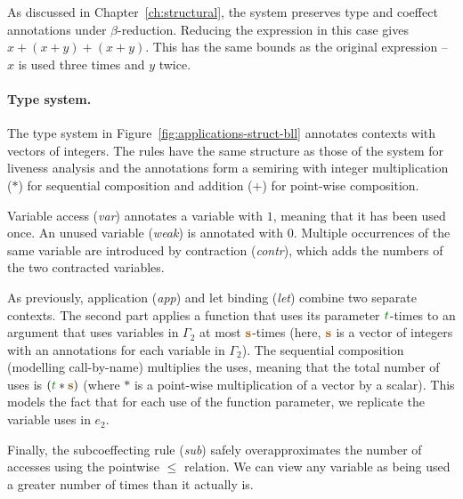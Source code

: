 As discussed in Chapter~\ref{ch:structural}, the system preserves type and coeffect annotations under
$\beta$-reduction. Reducing the expression in this case gives $x + (x+y) + (x+y)$. This has the
same bounds as the original expression -- $x$ is used three times and $y$ twice.


\paragraph{Type system.}
The type system in Figure~\ref{fig:applications-struct-bll} annotates contexts with vectors of integers.
The rules have the same structure as those of the system for liveness analysis and the annotations
form a semiring with integer multiplication ($\ast$) for sequential composition and addition 
($+$) for point-wise composition.

Variable access (\emph{var}) annotates a variable with $1$, meaning that it has been used once. An
unused variable (\emph{weak}) is annotated with $0$. Multiple occurrences of the same variable are
introduced by contraction (\emph{contr}), which adds the numbers of the two contracted variables.

As previously, application (\emph{app}) and let binding (\emph{let}) combine two separate contexts.
The second part applies a function that uses its parameter $\cclrd{t}$-times to an argument that uses
variables in $\Gamma_2$ at most $\aclrd{\mathbf{s}}$-times (here, $\aclrd{\mathbf{s}}$ is a vector of
integers with an annotations for each variable in $\Gamma_2$). The sequential composition (modelling
call-by-name) multiplies the uses, meaning that the total number of uses is $(\cclrd{t} \ast \aclrd{\mathbf{s}})$
(where $\ast$ is a point-wise multiplication of a vector by a scalar). This models the fact that
for each use of the function parameter, we replicate the variable uses in $e_2$.

Finally, the subcoeffecting rule (\emph{sub}) safely overapproximates the number of accesses using
the pointwise $\leq$ relation. We can view any variable as being used a greater
number of times than it actually is.

